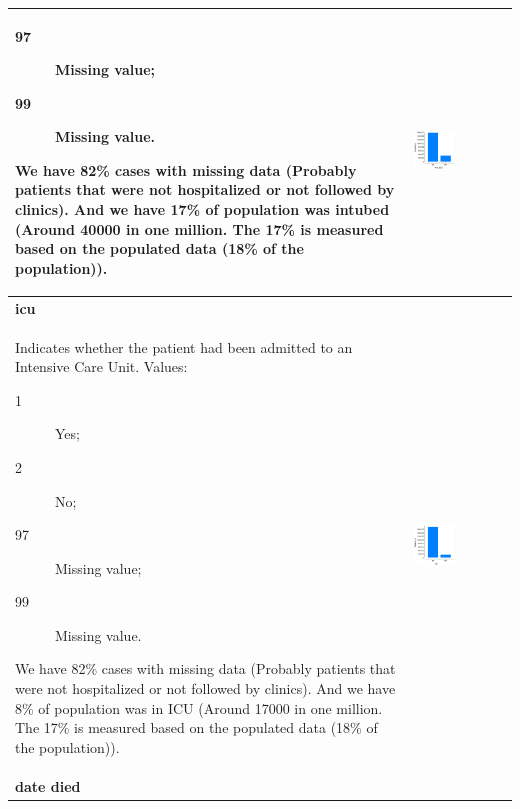 \begin{longtable}{P{0.45\textwidth}P{0.45\textwidth}}
\begin{description}
    \item[97] Missing value;
    \item[99] Missing value.
\end{description}
We have 82\% cases with missing data (Probably patients that were not hospitalized or not followed by clinics).
And we have 17\% of population was intubed (Around 40000 in one million. The 17\% is measured based on the populated data (18\% of the population)).
& \includegraphics[width=0.44\textwidth]{img/appendix/feature_intubed.png} 
\\ \hline
\textbf{icu} & \\
Indicates whether the patient had been admitted to an Intensive Care Unit. Values:
\begin{description}
    \item[1] Yes;
    \item[2] No;
    \item[97] Missing value;
    \item[99] Missing value.
\end{description}
We have 82\% cases with missing data (Probably patients that were not hospitalized or not followed by clinics).
And we have 8\% of population was in ICU (Around 17000 in one million. The 17\% is measured based on the populated data (18\% of the population)).
& \includegraphics[width=0.44\textwidth]{img/appendix/feature_icu.png} 
\\ \hline
\textbf{date died} & \\

\end{longtable}

